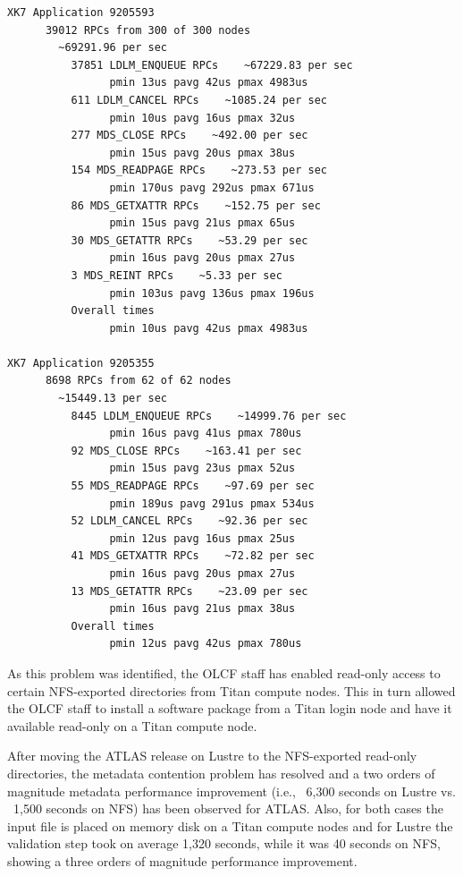 \begin{minipage}{\linewidth}
\begin{lstlisting}[language=bash,frame=single,basicstyle=\ttfamily\tiny,caption=ATLAS metadata trace,label=mdstrace] 
XK7 Application 9205593
      39012 RPCs from 300 of 300 nodes
        ~69291.96 per sec
          37851 LDLM_ENQUEUE RPCs    ~67229.83 per sec
                pmin 13us pavg 42us pmax 4983us
          611 LDLM_CANCEL RPCs    ~1085.24 per sec
                pmin 10us pavg 16us pmax 32us
          277 MDS_CLOSE RPCs    ~492.00 per sec
                pmin 15us pavg 20us pmax 38us
          154 MDS_READPAGE RPCs    ~273.53 per sec
                pmin 170us pavg 292us pmax 671us
          86 MDS_GETXATTR RPCs    ~152.75 per sec
                pmin 15us pavg 21us pmax 65us
          30 MDS_GETATTR RPCs    ~53.29 per sec
                pmin 16us pavg 20us pmax 27us
          3 MDS_REINT RPCs    ~5.33 per sec
                pmin 103us pavg 136us pmax 196us
          Overall times
                pmin 10us pavg 42us pmax 4983us

XK7 Application 9205355
      8698 RPCs from 62 of 62 nodes
        ~15449.13 per sec
          8445 LDLM_ENQUEUE RPCs    ~14999.76 per sec
                pmin 16us pavg 41us pmax 780us
          92 MDS_CLOSE RPCs    ~163.41 per sec
                pmin 15us pavg 23us pmax 52us
          55 MDS_READPAGE RPCs    ~97.69 per sec
                pmin 189us pavg 291us pmax 534us
          52 LDLM_CANCEL RPCs    ~92.36 per sec
                pmin 12us pavg 16us pmax 25us
          41 MDS_GETXATTR RPCs    ~72.82 per sec
                pmin 16us pavg 20us pmax 27us
          13 MDS_GETATTR RPCs    ~23.09 per sec
                pmin 16us pavg 21us pmax 38us
          Overall times
                pmin 12us pavg 42us pmax 780us

\end{lstlisting}
\end{minipage}

As this problem was identified, the OLCF staff has enabled read-only access to
certain NFS-exported directories from Titan compute nodes. This in turn allowed
the OLCF staff to install a software package from a Titan login node and have
it available read-only on a Titan compute node.  

After moving the ATLAS release on Lustre to the NFS-exported read-only
directories, the metadata contention problem has resolved and a two orders of
magnitude metadata performance improvement (i.e., ~6,300 seconds on Lustre vs.
~1,500 seconds on NFS) has been observed for ATLAS.  Also, for both cases the
input file is placed on memory disk on a Titan compute nodes and for Lustre the
validation step took on average 1,320 seconds, while it was 40 seconds on NFS,
showing a three orders of magnitude performance improvement. 

